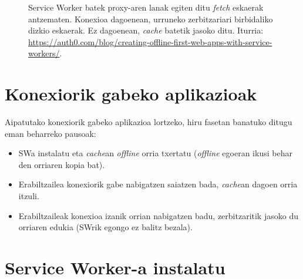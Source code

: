 \begin{figure}[ht]
	\centering
{}
\caption{Service Worker batek proxy-aren lanak egiten ditu \textit{fetch} eskaerak antzematen. Konexioa dagoenean, urruneko zerbitzariari birbidaliko dizkio eskaerak. Ez dagoenean, \textit{cache} batetik jasoko ditu. Iturria: \href{https://auth0.com/blog/creating-offline-first-web-apps-with-service-workers/}{https://auth0.com/blog/creating-offline-first-web-apps-with-service-workers/}.}
\label{fig:serviceworker3}
\end{figure}

\section{Konexiorik gabeko aplikazioak}

Aipatutako konexiorik gabeko aplikazioa lortzeko, hiru fasetan banatuko ditugu eman beharreko pausoak:

\begin{itemize}
    \item SWa instalatu eta \textit{cache}an \textit{offline} orria txertatu (\textit{offline} egoeran ikusi behar den orriaren kopia bat).
    \item Erabiltzailea konexiorik gabe nabigatzen saiatzen bada, \textit{cache}an dagoen orria itzuli.
    \item Erabiltzaileak konexioa izanik orrian nabigatzen badu, zerbitzaritik jasoko du orriaren edukia (SWrik egongo ez balitz bezala).
\end{itemize}

\section{Service Worker-a instalatu}

